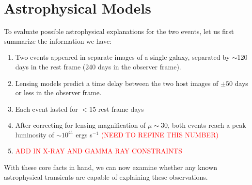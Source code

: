 \section{Astrophysical Models}

To evaluate possible astrophysical explanations for the two \spock events, let us first summarize the information we have:

\begin{enumerate}
\item{Two events appeared in separate images of a single galaxy, separated by $\sim$120 days in the rest frame (240 days in the observer frame).} 
\item{Lensing models predict a time delay between the two host images of $\pm50$ days or less in the observer frame.}
\item{Each event lasted for $<$15 rest-frame days}
\item{After correcting for lensing magnification of $\mu\sim30$, both events reach a peak luminosity of $\sim10^{41}$ ergs s$^{-1}$ \textcolor{red}{(NEED TO REFINE THIS NUMBER)}}
\item{\textcolor{red}{ADD IN X-RAY AND GAMMA RAY CONSTRAINTS}}
\end{enumerate}

With these core facts in hand, we can now examine whether any known astrophysical transients are capable of explaining these observations. 


